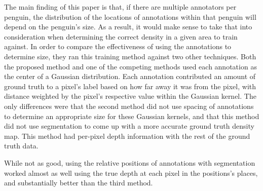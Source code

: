 The main finding of this paper is that, if there are multiple annotators per penguin, the
distribution of the locations of annotations within that penguin will depend on the penguin's size.
As a result, it would make sense to take that into consideration when determining the correct
density in a given area to train against. In order to compare the effectiveness of using the
annotations to determine size, they ran this training method against two other techniques. Both the
proposed method and one of the competing methods used each annotation as the center of a Gaussian
distribution. Each annotation contributed an amount of ground truth to a pixel's label based on how
far away it was from the pixel, with distance weighted by the pixel's respective value within the
Gaussian kernel. The only differences were that the second method did not use spacing of annotations
to determine an appropriate size for these Gaussian kernels, and that this method did not use
segmentation to come up with a more accurate ground truth density map. This method had per-pixel
depth information with the rest of the ground truth data.

While not as good, using the relative positions of annotations with segmentation worked almost as
well using the true depth at each pixel in the positions's places, and substantially better than the
third method.